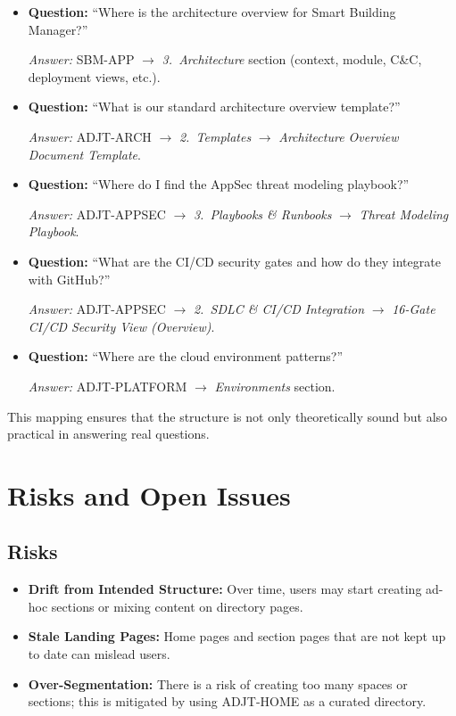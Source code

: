 \documentclass[11pt]{article}
\begin{document}
\begin{itemize}[leftmargin=*]
  \item \textbf{Question:} ``Where is the architecture overview for
        Smart Building Manager?''

        \emph{Answer:} SBM-APP $\rightarrow$
        \emph{3.~Architecture} section (context, module, C\&C,
        deployment views, etc.).
  \item \textbf{Question:} ``What is our standard architecture
        overview template?''

        \emph{Answer:} ADJT-ARCH $\rightarrow$
        \emph{2.~Templates} $\rightarrow$
        \emph{Architecture Overview Document Template}.
  \item \textbf{Question:} ``Where do I find the AppSec threat
        modeling playbook?''

        \emph{Answer:} ADJT-APPSEC $\rightarrow$
        \emph{3.~Playbooks \& Runbooks} $\rightarrow$
        \emph{Threat Modeling Playbook}.
  \item \textbf{Question:} ``What are the CI/CD security gates and
        how do they integrate with GitHub?''

        \emph{Answer:} ADJT-APPSEC $\rightarrow$
        \emph{2.~SDLC \& CI/CD Integration} $\rightarrow$
        \emph{16-Gate CI/CD Security View (Overview)}.
  \item \textbf{Question:} ``Where are the cloud environment
        patterns?''

        \emph{Answer:} ADJT-PLATFORM $\rightarrow$
        \emph{Environments} section.
\end{itemize}

This mapping ensures that the structure is not only theoretically
sound but also practical in answering real questions.

\section{Risks and Open Issues}

\subsection{Risks}

\begin{itemize}[leftmargin=*]
  \item \textbf{Drift from Intended Structure:} Over time, users may
        start creating ad-hoc sections or mixing content on directory
        pages.
  \item \textbf{Stale Landing Pages:} Home pages and section pages
        that are not kept up to date can mislead users.
  \item \textbf{Over-Segmentation:} There is a risk of creating too
        many spaces or sections; this is mitigated by using ADJT-HOME
        as a curated directory.
\end{itemize}
\end{document}
